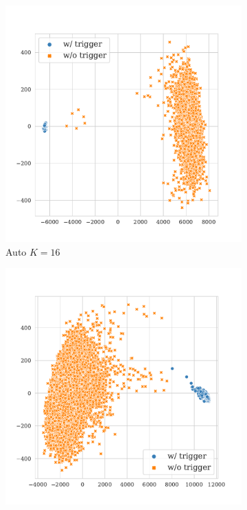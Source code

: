 \begin{figure}[!ht]
\begin{subfigure}{.33\textwidth}
  \centering
  \includegraphics[width=\linewidth]{figures/evaluation_media/qnli-roberta-large-visual-backdoor-auto-k16-seed42-candidates10-poison-cf-1137.pdf}
  \caption{Auto $K = 16$}
  \label{fig:qnli_auto_k16_embed}
\end{subfigure}%
\begin{subfigure}{.33\textwidth}
  \centering
  \includegraphics[width=\linewidth]{figures/evaluation_media/qnli-roberta-large-visual-backdoor-auto-k100-seed42-candidates10-poison-cf-125.pdf}

\end{subfigure}
\end{figure}
